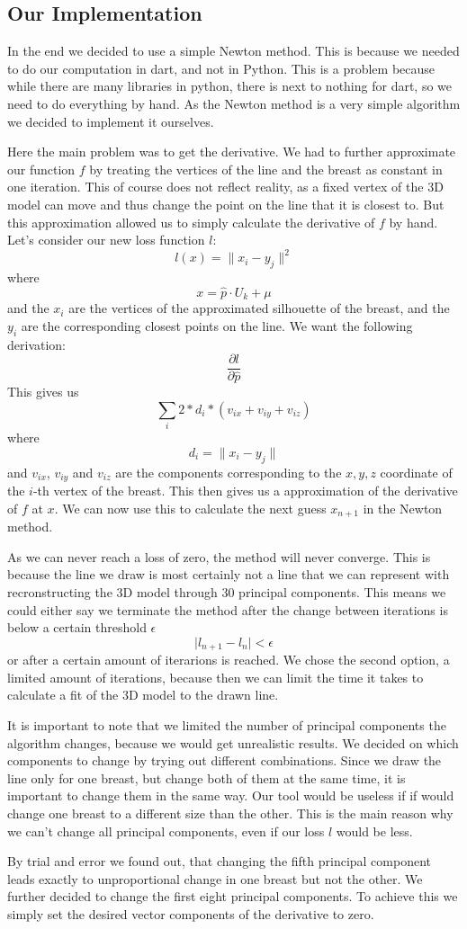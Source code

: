 \subsection{Our Implementation}

In the end we decided to use a simple Newton method. This is because we needed to do our computation in dart, and not in Python. This is a problem because while there are many
libraries in python, there is next to nothing for dart, so we need to do everything by hand. As the Newton method is a very simple algorithm we decided to implement it ourselves.

Here the main problem was to get the derivative. We had to further approximate our function $f$ by treating the vertices of the line and the breast as constant in one iteration. This of course does not
reflect reality, as a fixed vertex of the 3D model can move and thus change the point on the line that it is closest to. But this approximation allowed us to simply calculate the derivative of $f$ by hand.
Let's consider our new loss function $l$:
\[
    l(x) = \lVert x_i - y_j \rVert^2
\]
where 
\[
    x = \hat{p} \cdot U_k + \mu
\]
and the $x_i$ are the vertices of the approximated silhouette of the breast, and the $y_i$ are the corresponding closest points on the line. We want the following derivation:
\[
    \frac{\partial l}{\partial \hat{p}}
\]
This gives us
\[
    \sum_{i}{} 2 * d_i * (v_{ix} + v_{iy} + v_{iz})
\]
where
\[
    d_i = \lVert x_i - y_j \rVert
\]
and $v_{ix}$, $v_{iy}$ and $v_{iz}$ are the components corresponding to the $x,y,z$ coordinate of the $i$-th vertex of the breast. This then gives us a approximation of the derivative of $f$ at $x$.
We can now use this to calculate the next guess $x_{n+1}$ in the Newton method. 

As we can never reach a loss of zero, the method will never converge. This is because the line we draw is most
certainly not a line that we can represent with recronstructing the 3D model through 30 principal components. This means we could either say we terminate the method after the change between
iterations is below a certain threshold $\epsilon$
\[
    \lvert l_{n+1} - l_n \rvert < \epsilon  
\]
or after a certain amount of iterarions is reached. We chose the second option, a limited amount of iterations, because then we can limit the time it takes to calculate a fit of the 3D model
to the drawn line. 

It is important to note that we limited the number of principal components the algorithm changes, because we would get unrealistic results. We decided on which components to 
change by trying out different combinations. Since we draw the line only for one breast, but change both of them at the same time, it is important to change them in the same way. Our tool would be useless if
if would change one breast to a different size than the other. This is the main reason why we can't change all principal components, even if our loss $l$ would be less. 

By trial and error we found out, that changing the fifth principal component leads exactly to unproportional change in one breast but not the other. We further decided to change the first eight 
principal components. To achieve this we simply set the desired vector components of the derivative to zero.